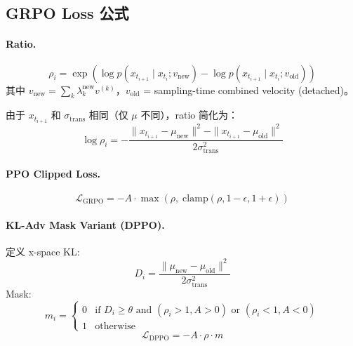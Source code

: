 \documentclass[11pt,a4paper]{article}
\newcommand{\loss}{\mathcal{L}}
\theoremstyle{definition}
\begin{document}
\subsection{GRPO Loss 公式}

\paragraph{Ratio.}
\begin{equation}
\rho_i = \exp\!\left(\log p(x_{t_{i+1}} \mid x_{t_i}; v_{\mathrm{new}}) - \log p(x_{t_{i+1}} \mid x_{t_i}; v_{\mathrm{old}})\right)
\end{equation}
其中 $v_{\mathrm{new}} = \sum_k \lambda_k^{\mathrm{new}} v^{(k)}$，$v_{\mathrm{old}}$ = sampling-time combined velocity (detached)。

由于 $x_{t_{i+1}}$ 和 $\sigma_{\mathrm{trans}}$ 相同（仅 $\mu$ 不同），ratio 简化为：
\begin{equation}
\log \rho_i = -\frac{\|x_{t_{i+1}} - \mu_{\mathrm{new}}\|^2 - \|x_{t_{i+1}} - \mu_{\mathrm{old}}\|^2}{2\sigma_{\mathrm{trans}}^2}
\end{equation}

\paragraph{PPO Clipped Loss.}
\begin{equation}
\boxed{
\loss_{\mathrm{GRPO}} = -A \cdot \max\!\left(\rho,\; \mathrm{clamp}(\rho, 1-\epsilon, 1+\epsilon)\right)
}
\label{eq:grpo_loss}
\end{equation}

\paragraph{KL-Adv Mask Variant (DPPO).}
定义 x-space KL:
\begin{equation}
D_i = \frac{\|\mu_{\mathrm{new}} - \mu_{\mathrm{old}}\|^2}{2\sigma_{\mathrm{trans}}^2}
\end{equation}
Mask:
\begin{equation}
m_i = \begin{cases}
0 & \text{if } D_i \geq \theta \text{ and } (\rho_i > 1, A > 0) \text{ or } (\rho_i < 1, A < 0) \\
1 & \text{otherwise}
\end{cases}
\end{equation}
\begin{equation}
\loss_{\mathrm{DPPO}} = -A \cdot \rho \cdot m
\end{equation}
\end{document}
